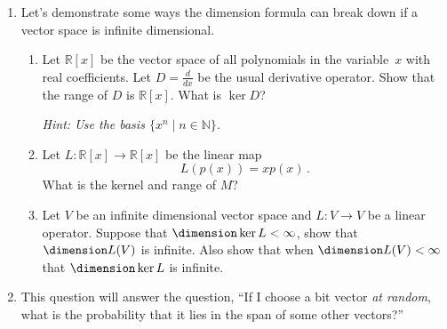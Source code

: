 \begin{enumerate}

\item %
Let's demonstrate some ways the dimension formula can break down if a vector space is infinite dimensional.
\begin{enumerate}
\item Let $\mathbb{R}[x]$ be the vector space of all polynomials  in the variable~$x$ with real coefficients. Let $D = \frac{d}{dx}$ be the usual derivative operator. Show that the range of $D$ is $\mathbb{R}[x]$. What is $\ker D$?

\emph{Hint: Use the basis $\{ x^n \mid n \in \mathbb{N} \}$.}

\item Let $L \colon \mathbb{R}[x] \rightarrow \mathbb{R}[x]$ be the linear map \[L(p(x)) = xp(x)\, .\]  What is the kernel and range of $M$?



\item Let $V$ be an infinite dimensional vector space and $L \colon V \rightarrow V$ be a linear operator. Suppose that $\dimension \ker L < \infty$, show that $\dimension L(V)$ is infinite. Also show that when $\dimension L(V) < \infty$ that $\dimension \ker L$ is infinite.
\end{enumerate}

\item This question will answer the question, ``If I choose a bit vector \emph{at random}, what is the probability that it lies in the span of some other vectors?''


\end{enumerate}
